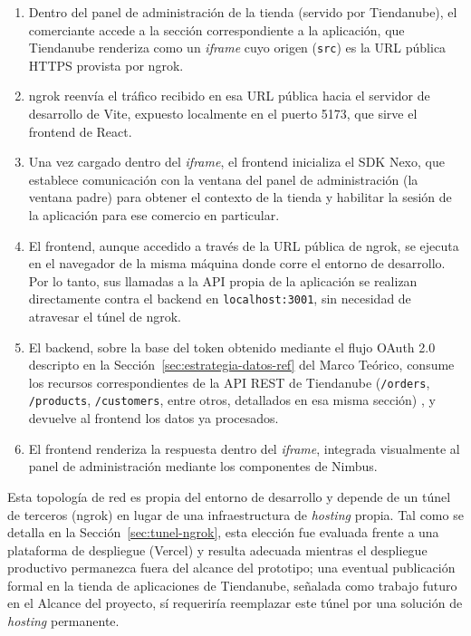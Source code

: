 \begin{enumerate}
    \item Dentro del panel de administración de la tienda (servido por Tiendanube), el comerciante accede a la sección correspondiente a la aplicación, que Tiendanube renderiza como un \emph{iframe} cuyo origen (\texttt{src}) es la URL pública HTTPS provista por ngrok.

    \item ngrok reenvía el tráfico recibido en esa URL pública hacia el servidor de desarrollo de Vite, expuesto localmente en el puerto 5173, que sirve el frontend de React.

    \item Una vez cargado dentro del \emph{iframe}, el frontend inicializa el SDK Nexo, que establece comunicación con la ventana del panel de administración (la ventana padre) para obtener el contexto de la tienda y habilitar la sesión de la aplicación para ese comercio en particular.

    \item El frontend, aunque accedido a través de la URL pública de ngrok, se ejecuta en el navegador de la misma máquina donde corre el entorno de desarrollo. Por lo tanto, sus llamadas a la API propia de la aplicación se realizan directamente contra el backend en \texttt{localhost:3001}, sin necesidad de atravesar el túnel de ngrok.

    \item El backend, sobre la base del token obtenido mediante el flujo OAuth 2.0 descripto en la Sección~\ref{sec:estrategia-datos-ref} del Marco Teórico, consume los recursos correspondientes de la API REST de Tiendanube (\texttt{/orders}, \texttt{/products}, \texttt{/customers}, entre otros, detallados en esa misma sección) \parencite{TiendanubeAPI2024}, y devuelve al frontend los datos ya procesados.

    \item El frontend renderiza la respuesta dentro del \emph{iframe}, integrada visualmente al panel de administración mediante los componentes de Nimbus.
\end{enumerate}

Esta topología de red es propia del entorno de desarrollo y depende de un túnel de terceros (ngrok) en lugar de una infraestructura de \emph{hosting} propia. Tal como se detalla en la Sección~\ref{sec:tunel-ngrok}, esta elección fue evaluada frente a una plataforma de despliegue (Vercel) y resulta adecuada mientras el despliegue productivo permanezca fuera del alcance del prototipo; una eventual publicación formal en la tienda de aplicaciones de Tiendanube, señalada como trabajo futuro en el Alcance del proyecto, sí requeriría reemplazar este túnel por una solución de \emph{hosting} permanente.

